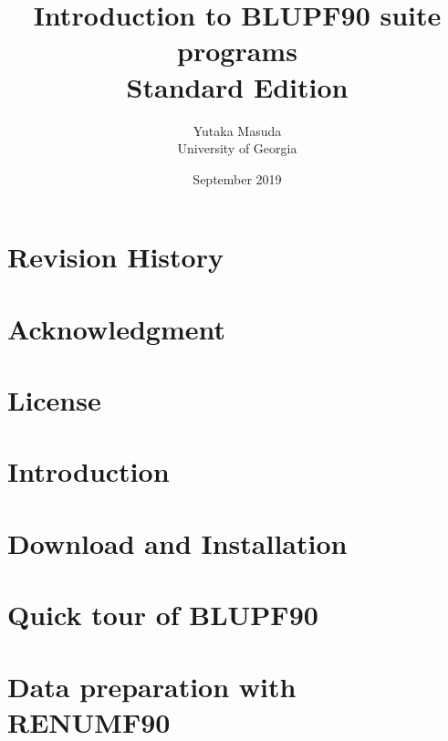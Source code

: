 \documentclass[letterpaper,oneside,10pt]{scrbook}
\begin{document}
\frontmatter
\title{Introduction to BLUPF90 suite programs\\ Standard Edition}
\author{Yutaka Masuda\\ University of Georgia}
\date{September 2019}
\maketitle

\chapter{Revision History}


\chapter{Acknowledgment}


\chapter{License}


\tableofcontents

\mainmatter
%
\chapter{Introduction}





\chapter{Download and Installation}







\chapter{Quick tour of BLUPF90}






\chapter{Data preparation with RENUMF90}







\end{document}
